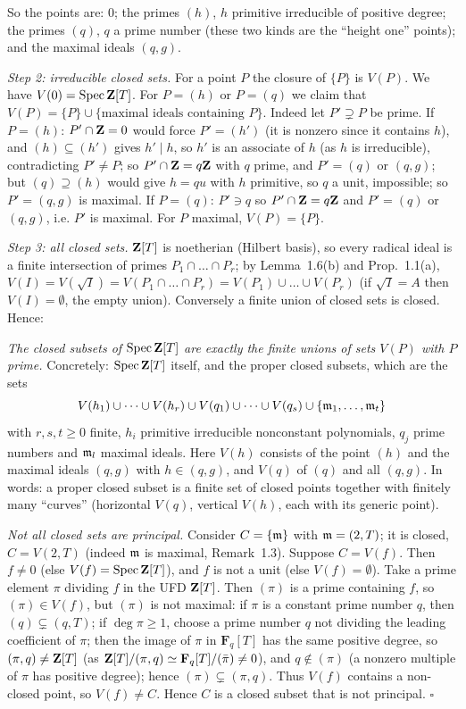 \documentclass[11pt]{article}
\begin{document}
So the points are: $0$; the primes $(h)$, $h$ primitive irreducible of positive degree; the primes $(q)$, $q$ a prime number (these two kinds are the ``height one'' points); and the maximal ideals $(q,g)$.

\emph{Step 2: irreducible closed sets.} For a point $P$ the closure of $\{P\}$ is $V(P)$. We have $V(0)=\operatorname{Spec}\mathbf Z[T]$. For $P=(h)$ or $P=(q)$ we claim that $V(P)=\{P\}\cup\{\text{maximal ideals containing }P\}$. Indeed let $P'\supsetneq P$ be prime. If $P=(h)$: $P'\cap\mathbf Z=0$ would force $P'=(h')$ (it is nonzero since it contains $h$), and $(h)\subseteq(h')$ gives $h'\mid h$, so $h'$ is an associate of $h$ (as $h$ is irreducible), contradicting $P'\ne P$; so $P'\cap\mathbf Z=q\mathbf Z$ with $q$ prime, and $P'=(q)$ or $(q,g)$; but $(q)\supseteq(h)$ would give $h=qu$ with $h$ primitive, so $q$ a unit, impossible; so $P'=(q,g)$ is maximal. If $P=(q)$: $P'\ni q$ so $P'\cap\mathbf Z=q\mathbf Z$ and $P'=(q)$ or $(q,g)$, i.e. $P'$ is maximal. For $P$ maximal, $V(P)=\{P\}$.

\emph{Step 3: all closed sets.} $\mathbf Z[T]$ is noetherian (Hilbert basis), so every radical ideal is a finite intersection of primes $P_1\cap\dots\cap P_r$; by Lemma~1.6(b) and Prop.~1.1(a), $V(I)=V(\sqrt I)=V(P_1\cap\dots\cap P_r)=V(P_1)\cup\dots\cup V(P_r)$ (if $\sqrt I=A$ then $V(I)=\emptyset$, the empty union). Conversely a finite union of closed sets is closed. Hence:

\emph{The closed subsets of $\operatorname{Spec}\mathbf Z[T]$ are exactly the finite unions of sets $V(P)$ with $P$ prime.} Concretely: $\operatorname{Spec}\mathbf Z[T]$ itself, and the proper closed subsets, which are the sets
\[ V(h_1)\cup\dots\cup V(h_r)\cup V(q_1)\cup\dots\cup V(q_s)\cup\{\mathfrak m_1,\dots,\mathfrak m_t\} \]
with $r,s,t\ge0$ finite, $h_i$ primitive irreducible nonconstant polynomials, $q_j$ prime numbers and $\mathfrak m_l$ maximal ideals. Here $V(h)$ consists of the point $(h)$ and the maximal ideals $(q,g)$ with $h\in(q,g)$, and $V(q)$ of $(q)$ and all $(q,g)$. In words: a proper closed subset is a finite set of closed points together with finitely many ``curves'' (horizontal $V(q)$, vertical $V(h)$, each with its generic point).

\emph{Not all closed sets are principal.} Consider $C=\{\mathfrak m\}$ with $\mathfrak m=(2,T)$; it is closed, $C=V(2,T)$ (indeed $\mathfrak m$ is maximal, Remark~1.3). Suppose $C=V(f)$. Then $f\neq0$ (else $V(f)=\operatorname{Spec}\mathbf Z[T]$), and $f$ is not a unit (else $V(f)=\emptyset$). Take a prime element $\pi$ dividing $f$ in the UFD $\mathbf Z[T]$. Then $(\pi)$ is a prime containing $f$, so $(\pi)\in V(f)$, but $(\pi)$ is not maximal: if $\pi$ is a constant prime number $q$, then $(q)\subsetneq(q,T)$; if $\deg\pi\ge1$, choose a prime number $q$ not dividing the leading coefficient of $\pi$; then the image of $\pi$ in $\mathbf F_q[T]$ has the same positive degree, so $(\pi,q)\ne\mathbf Z[T]$ (as $\mathbf Z[T]/(\pi,q)\simeq\mathbf F_q[T]/(\bar\pi)\neq0$), and $q\notin(\pi)$ (a nonzero multiple of $\pi$ has positive degree); hence $(\pi)\subsetneq(\pi,q)$. Thus $V(f)$ contains a non-closed point, so $V(f)\neq C$. Hence $C$ is a closed subset that is not principal. \hfill$\square$
\end{document}
